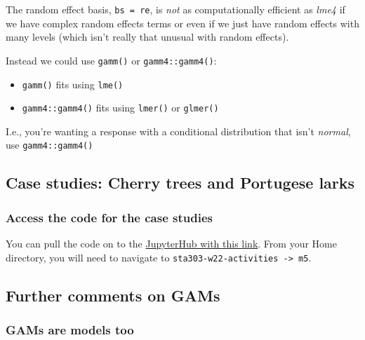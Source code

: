 \documentclass[
  openany]{book}
\providecommand{\tightlist}{%
  \setlength{\itemsep}{0pt}\setlength{\parskip}{0pt}}
\begin{document}
The random effect basis, \texttt{bs\ =\ \textquotesingle{}re\textquotesingle{}}, is \emph{not} as computationally efficient as \emph{lme4} if we have complex random effects terms or even if we just have random effects with many levels (which isn't really that unusual with random effects).

Instead we could use \texttt{gamm()} or \texttt{gamm4::gamm4()}:

\begin{itemize}
\tightlist
\item
  \texttt{gamm()} fits using \texttt{lme()}
\item
  \texttt{gamm4::gamm4()} fits using \texttt{lmer()} or \texttt{glmer()}
\end{itemize}

I.e., you're wanting a response with a conditional distribution that isn't \emph{normal}, use \texttt{gamm4::gamm4()}

\hypertarget{case-studies-cherry-trees-and-portugese-larks}{%
\subsection{Case studies: Cherry trees and Portugese larks}\label{case-studies-cherry-trees-and-portugese-larks}}

\hypertarget{access-the-code-for-the-case-studies-1}{%
\subsubsection{Access the code for the case studies}\label{access-the-code-for-the-case-studies-1}}

You can pull the code on to the \href{https://jupyter.utoronto.ca/hub/user-redirect/git-pull?repo=https\%3A\%2F\%2Fgithub.com\%2Fsta303-bolton\%2Fsta303-w22-activities\&urlpath=rstudio\%2F}{JupyterHub with this
link}.
From your Home directory, you will need to navigate to
\texttt{sta303-w22-activities\ -\textgreater{}\ m5}.

\hypertarget{further-comments-on-gams}{%
\subsection{Further comments on GAMs}\label{further-comments-on-gams}}

\hypertarget{gams-are-models-too}{%
\subsubsection{GAMs are models too}\label{gams-are-models-too}}
\end{document}
